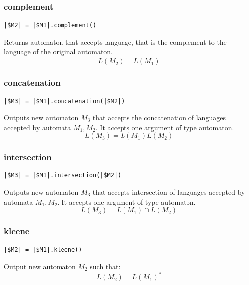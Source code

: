 \documentclass{ctuthesis}
\begin{document}
\subsubsection{complement}
\begin{lstlisting}[language = JASL_snippet]
	|$M2| = |$M1|.complement()
\end{lstlisting}

Returns automaton that accepts language, that is the complement to the language of the original automaton.
\begin{equation*}
	L(M_2) = \overline{L(M_1)}
\end{equation*}

\subsubsection{concatenation}
\begin{lstlisting}[language = JASL_snippet]
	|$M3| = |$M1|.concatenation(|$M2|)
\end{lstlisting}

Outputs new automaton $M_3$ that accepts the concatenation of languages accepted by automata $M_1, M_2$. It accepts one argument of type automaton.
\begin{equation*}
	L(M_3) = L(M_1)L(M_2)
\end{equation*}

\subsubsection{intersection}
\begin{lstlisting}[language = JASL_snippet]
	|$M3| = |$M1|.intersection(|$M2|)
\end{lstlisting}

Outputs new automaton $M_3$ that accepts intersection of languages accepted by automata $M_1, M_2$. It accepts one argument of type automaton.
\begin{equation*}
	L(M_3) = L(M_1) \cap L(M_2)
\end{equation*}

\subsubsection{kleene}
\begin{lstlisting}[language = JASL_snippet]
	|$M2| = |$M1|.kleene()
\end{lstlisting}

Output new automaton $M_2$ such that:
\begin{equation*}
	L(M_2) = L(M_1)^*
\end{equation*}
\end{document}
